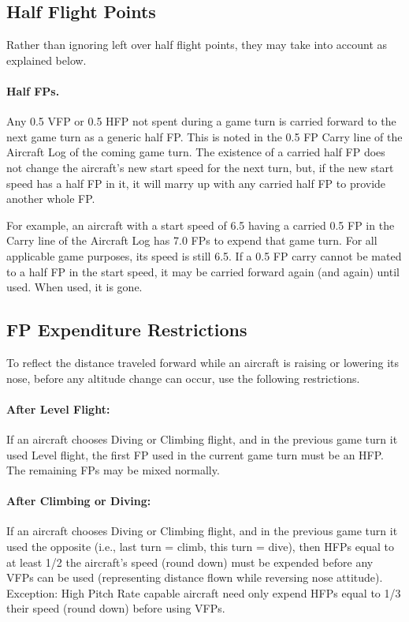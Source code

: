 \advancedrules

\subsection{Half Flight Points}


Rather than ignoring left over half flight points, they may take into account as explained below.

\paragraph{Half FPs.} Any 0.5 VFP or 0.5 HFP not spent during a game turn is carried forward to the next game turn as a generic half FP. This is noted in the 0.5 FP Carry line of the Aircraft Log of the coming game turn. The existence of a carried half FP does not change the aircraft's new start speed for the next turn, but, if the new start speed has a half FP in it, it will marry up with any carried half FP to provide another whole FP.

For example, an aircraft with a start speed of 6.5 having a carried 0.5 FP in the Carry line of the Aircraft Log has 7.0 FPs to expend that game turn. For all applicable game purposes, its speed is still 6.5. If a 0.5 FP carry cannot be mated to a half FP in the start speed, it may be carried forward again (and again) until used. When used, it is gone.

\subsection{FP Expenditure Restrictions}

To reflect the distance traveled forward while an aircraft is raising or lowering its nose, before any altitude change can occur, use the following restrictions.

\paragraph{After Level Flight:} If an aircraft chooses Diving or Climbing flight, and in the previous game turn it used Level flight, the first FP used in the current game turn must be an HFP. The remaining FPs may be mixed normally.

\paragraph{After Climbing or Diving:} If an aircraft chooses Diving or Climbing flight, and in the previous game turn it used the opposite (i.e., last turn = climb, this turn = dive), then HFPs equal to at least 1/2 the aircraft's speed (round down) must be expended before any VFPs can be used (representing distance flown while reversing nose attitude). Exception: High Pitch Rate capable aircraft need only expend HFPs equal to 1/3 their speed (round down) before using VFPs.

